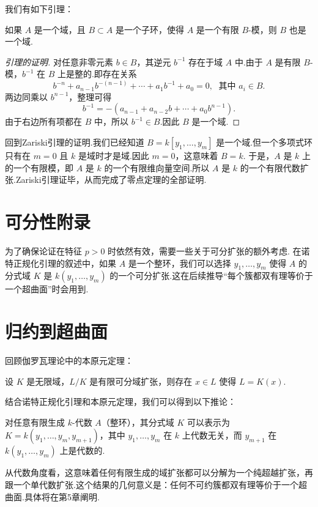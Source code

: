 我们有如下引理：
\begin{lemma}
如果 \(A\) 是一个域，且 \(B \subset  A\) 是一个子环，使得 \(A\) 是一个有限 \(B\)-模，则 \(B\) 也是一个域.
\end{lemma}
\begin{proof}[引理的证明]
对任意非零元素 \(b \in B\)，其逆元 \({b}^{-1}\) 存在于域 \(A\) 中.由于 \(A\) 是有限 \(B\)-模，\({b}^{-1}\) 在 \(B\) 上是整的.即存在关系
\[
{b}^{-n} + {a}_{n - 1}{b}^{-(n - 1)} + \cdots  + {a}_{1}{b}^{-1} + {a}_{0} = 0,\;\text{ 其中 }{a}_{i} \in  B.
\]
两边同乘以 \({b}^{n - 1}\)，整理可得
\[
{b}^{-1} =  - \left( {{a}_{n - 1} + {a}_{n - 2}b + \cdots  + {a}_{0}{b}^{n - 1}}\right).
\]
由于右边所有项都在 \(B\) 中，所以 \({b}^{-1} \in B\).因此 \(B\) 是一个域.
\end{proof}

回到Zariski引理的证明.我们已经知道 \(B = k\left\lbrack  {{y}_{1},\ldots ,{y}_{m}}\right\rbrack\) 是一个域.但一个多项式环只有在 \(m=0\) 且 \(k\) 是域时才是域.因此 \(m=0\)，这意味着 \(B=k\).
于是，\(A\) 是 \(k\) 上的一个有限模，即 \(A\) 是 \(k\) 的一个有限维向量空间.所以 \(A\) 是 \(k\) 的一个有限代数扩张.Zariski引理证毕，从而完成了零点定理的全部证明.

\section{可分性附录}

为了确保论证在特征 \(p>0\) 时依然有效，需要一些关于可分扩张的额外考虑.
在诺特正规化引理的叙述中，如果 \(A\) 是一个整环，我们可以选择 \({y}_{1},\ldots ,{y}_{m}\) 使得 \(A\) 的分式域 \(K\) 是 \(k\left( {{y}_{1},\ldots ,{y}_{m}}\right)\) 的一个可分扩张.这在后续推导“每个簇都双有理等价于一个超曲面”时会用到.

\section{归约到超曲面}

回顾伽罗瓦理论中的本原元定理：
\begin{theorem}[本原元定理]
设 \(K\) 是无限域，\(L/K\) 是有限可分域扩张，则存在 \(x \in  L\) 使得 \(L = K\left( x\right)\).
\end{theorem}

结合诺特正规化引理和本原元定理，我们可以得到以下推论：
\begin{corollary}
对任意有限生成 \(k\)-代数 \(A\)（整环），其分式域 \(K\) 可以表示为 \(K = k(y_1, \ldots, y_m, y_{m+1})\)，其中 \(y_1, \ldots, y_m\) 在 \(k\) 上代数无关，而 \(y_{m+1}\) 在 \(k(y_1, \ldots, y_m)\) 上是代数的.
\end{corollary}
从代数角度看，这意味着任何有限生成的域扩张都可以分解为一个纯超越扩张，再跟一个单代数扩张.这个结果的几何意义是：任何不可约簇都双有理等价于一个超曲面.具体将在第5章阐明.

